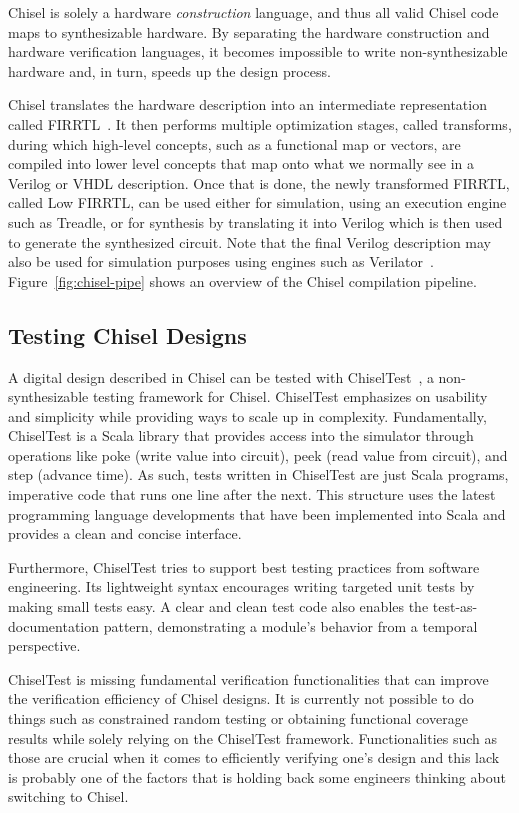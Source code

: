 \documentclass[conference]{IEEEtran}
\begin{document}
Chisel is solely a hardware \emph{construction} language, and thus all valid Chisel code maps to synthesizable hardware.
By separating the hardware construction and hardware verification languages, it becomes impossible to write non-synthesizable hardware and, in turn, speeds up the design process.

Chisel translates the hardware description into an intermediate representation called FIRRTL~\cite{firrtl}. It then performs multiple optimization stages, called transforms, during which high-level concepts, such as a functional map or vectors, are compiled into lower level concepts that map onto what we normally see in a Verilog or VHDL description. Once that is done, the newly transformed FIRRTL, called Low FIRRTL, can be used either for simulation, using an execution engine such as Treadle, or for synthesis by translating it into Verilog which is then used to generate the synthesized circuit. Note that the final Verilog description may also be used for simulation purposes using engines such as Verilator~\cite{verilator}. Figure~\ref{fig:chisel-pipe} shows an overview of the Chisel compilation pipeline.


\subsection{Testing Chisel Designs}
A digital design described in Chisel can be tested with ChiselTest~\cite{chisel:tester2}, a non-synthesizable testing framework for Chisel.
ChiselTest emphasizes on usability and simplicity while providing ways to scale up in complexity.
Fundamentally, ChiselTest is a Scala library that provides access into the simulator through
operations like poke (write value into circuit), peek (read value from circuit), and step (advance time).
As such, tests written in ChiselTest are just Scala programs, imperative code that runs one line after the next.
This structure uses the latest programming language developments that have been implemented into Scala
and provides a clean and concise interface.

Furthermore, ChiselTest tries to support best testing practices from software engineering.
Its lightweight syntax encourages writing targeted unit tests by making small tests easy.
A clear and clean test code also enables the test-as-documentation pattern,
demonstrating a module's behavior from a temporal perspective.

ChiselTest is missing fundamental verification functionalities that can improve the verification efficiency of Chisel designs. 
It is currently not possible to do things such as constrained random testing or obtaining functional coverage results while solely relying on the ChiselTest framework. 
Functionalities such as those are crucial when it comes to efficiently verifying one's design and this lack is probably one of the factors that is holding back some engineers thinking about switching to Chisel. 
\end{document}
